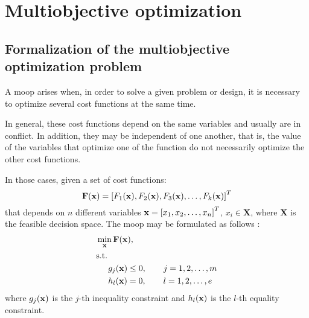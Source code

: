 \chapter{Multiobjective optimization}
\label{chap:Multi-objective}


\section{Formalization of the multiobjective optimization problem}
\label{sec:MOOPForm}
%
A \gls{moop} arises when, in order to solve a given problem or design, it is necessary to optimize several cost functions at the same time. 

In general, these cost functions depend on the same variables and usually are in conflict.  In addition, they may be independent of one another, that is, the value of the variables that optimize one of the function do not necessarily optimize the other cost functions.

In those cases, given a set of cost functions:
\begin{equation}
\mathbf{F}(\mathbf{x})=\left[F_1(\mathbf{x}), F_2(\mathbf{x}), F_3(\mathbf{x}), \ldots, F_k(\mathbf{x})\right]^T
\label{eq:functions}
\end{equation}
%
that depends on $n$ different variables $\mathbf{x}=\left[x_1, x_2, \ldots, x_n \right]^T$, $x_i \in \mathbf{X}$, where $\mathbf{X}$ is the feasible decision space. The \gls{moop} may be formulated as follows \citep{Marler2004}:%
%
\begin{subequations}%
	\begin{align}%
	&\min_\xv \mathbf{F}(\xv), \label{eq:Min01}\\ %
	&\text{s.t.}\nonumber\\%
	& \hspace{5mm} g_j(\xv) \leq 0, \qquad j=1,2,\ldots,m  \label{eq:Min02}\\ %
	& \hspace{5mm} h_l(\xv) = 0, \qquad l=1,2,\ldots,e  \label{eq:Min03}%
	\end{align}%
	\label{eq:OptProb}%
\end{subequations}%
%
where $g_j(\mathbf{x})$ is the $j$-th inequality constraint and $h_l(\mathbf{x})$ is the $l$-th equality constraint. 
%
